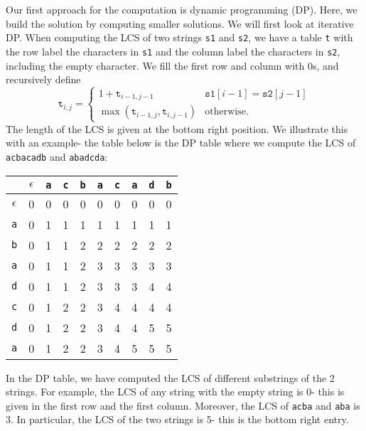 \documentclass[a4paper, openany]{memoir}
\begin{document}
    Our first approach for the computation is dynamic programming (DP). Here, we build the solution by computing smaller solutions. We will first look at iterative DP. When computing the LCS of two strings \texttt{s1} and \texttt{s2}, we have a table \texttt{t} with the  row label the characters in \texttt{s1} and the column label the characters in \texttt{s2}, including the empty character. We fill the first row and column with 0s, and recursively define
    \[\texttt{t}_{i, j} = \begin{cases}
        1 + \texttt{t}_{i-1, j-1} & \texttt{s1}[i-1] = \texttt{s2}[j-1] \\
        \max (\texttt{t}_{i-1, j}, \texttt{t}_{i, j-1}) & \text{otherwise}.
    \end{cases}\]
    The length of the LCS is given at the bottom right position. We illustrate this with an example- the table below is the DP table where we compute the LCS of \texttt{acbacadb} and \texttt{abadcda}:
    \begin{table}[H]
        \centering
        \begin{tabular}{c|ccccccccc}
            & $\epsilon$ & \texttt{a} & \texttt{c} & \texttt{b} & \texttt{a} & \texttt{c} & \texttt{a} & \texttt{d} & \texttt{b} \\
            \hline 
            $\epsilon$ & 0 & 0 & 0 & 0 & 0 & 0 & 0 & 0 & 0 \\
            \texttt{a} & 0 & 1 & 1 & 1 & 1 & 1 & 1 & 1 & 1 \\
            \texttt{b} & 0 & 1 & 1 & 2 & 2 & 2 & 2 & 2 & 2 \\
            \texttt{a} & 0 & 1 & 1 & 2 & 3 & 3 & 3 & 3 & 3 \\
            \texttt{d} & 0 & 1 & 1 & 2 & 3 & 3 & 3 & 4 & 4 \\
            \texttt{c} & 0 & 1 & 2 & 2 & 3 & 4 & 4 & 4 & 4 \\
            \texttt{d} & 0 & 1 & 2 & 2 & 3 & 4 & 4 & 5 & 5 \\
            \texttt{a} & 0 & 1 & 2 & 2 & 3 & 4 & 5 & 5 & 5 
        \end{tabular}
    \end{table}
    In the DP table, we have computed the LCS of different substrings of the 2 strings. For example, the LCS of any string with the empty string is 0- this is given in the first row and the first column. Moreover, the LCS of \texttt{acba} and \texttt{aba} is 3. In particular, the LCS of the two strings is 5- this is the bottom right entry.
\end{document}

